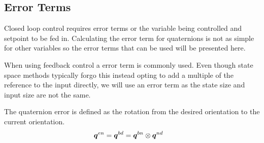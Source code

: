 \label{subsec:ErrorTerms}
\subsection{Error Terms}
Closed loop control requires error terms or the variable being controlled and setpoint to be fed in.
Calculating the error term for quaternions is not as simple for other variables so the error terms that can be used will be presented here.

When using feedback control a error term is commonly used.
Even though state space methods typically forgo this instead opting to add a multiple of the reference to the input directly, we will use an error term as the state size and input size are not the same.

The quaternion error is defined as the rotation from the desired orientation to the current orientation.
\begin{align}
    \bm q^{en} &= \bm q^{bd} = \bm q^{bn} \otimes \bm q^{nd}
\end{align}

